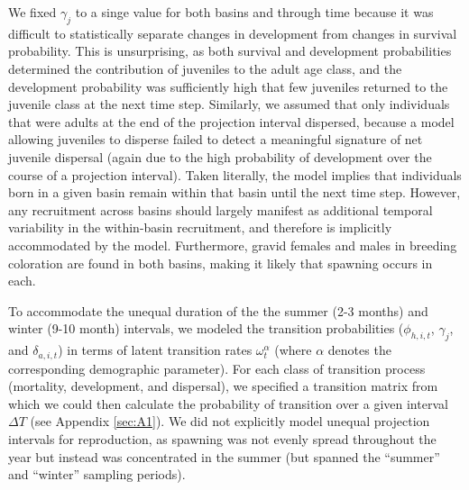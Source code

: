 %
We fixed $\gamma_{j}$ to a singe value for both basins and through time because 
it was difficult to statistically separate changes in development from changes 
in survival probability.
This is unsurprising, as both survival and development probabilities
determined the contribution of juveniles to the adult age class,
and the development probability was sufficiently 
high that few juveniles returned to the juvenile class at the next time step. 
Similarly, we assumed that only individuals that were adults at the end of the projection
interval dispersed, because a model allowing juveniles to disperse failed to detect 
a meaningful signature of net juvenile dispersal 
(again due to the high probability of development over the course of a projection interval).
Taken literally, the model implies that individuals born in a given basin
remain within that basin until the next time step.
However, any recruitment across basins should largely manifest 
as additional temporal variability in the within-basin recruitment,
and therefore is implicitly accommodated by the model.
Furthermore, gravid females and males in breeding coloration are found in both basins,
making it likely that spawning occurs in each.

To accommodate the unequal duration of the the summer (2-3 months) and winter (9-10 month)
intervals, we modeled the transition probabilities 
($\phi_{h,i,t}$, $\gamma_{j}$, and $\delta_{a,i,t}$)
in terms of latent transition rates $\omega^{\alpha}_{t}$ 
(where $\alpha$ denotes the corresponding demographic parameter).
For each class of transition process (mortality, development, and dispersal),
we specified a transition matrix from which we could then calculate
the probability of transition over a given interval $\Delta T$ 
(see Appendix \ref{sec:A1}).
We did not explicitly model unequal projection intervals for reproduction,
as spawning was not evenly spread throughout the year but instead was concentrated
in the summer (but spanned the ``summer'' and ``winter'' sampling periods).

